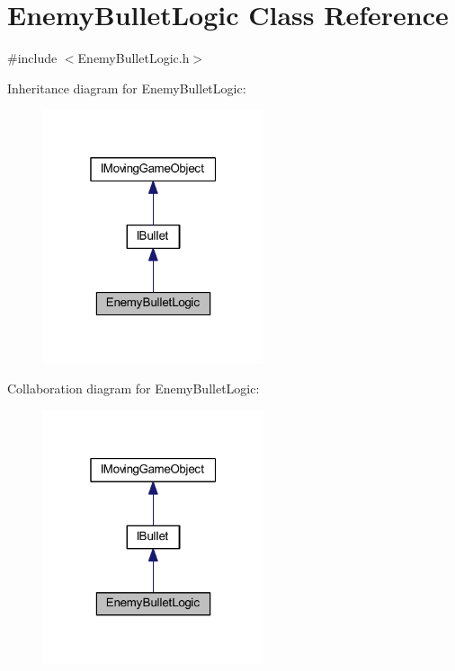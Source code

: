\hypertarget{class_enemy_bullet_logic}{}\section{Enemy\+Bullet\+Logic Class Reference}
\label{class_enemy_bullet_logic}


{\ttfamily \#include $<$Enemy\+Bullet\+Logic.\+h$>$}



Inheritance diagram for Enemy\+Bullet\+Logic\+:\nopagebreak
\begin{figure}[H]
\begin{center}
\leavevmode
\includegraphics[width=184pt]{class_enemy_bullet_logic__inherit__graph}
\end{center}
\end{figure}


Collaboration diagram for Enemy\+Bullet\+Logic\+:\nopagebreak
\begin{figure}[H]
\begin{center}
\leavevmode
\includegraphics[width=184pt]{class_enemy_bullet_logic__coll__graph}
\end{center}
\end{figure}
